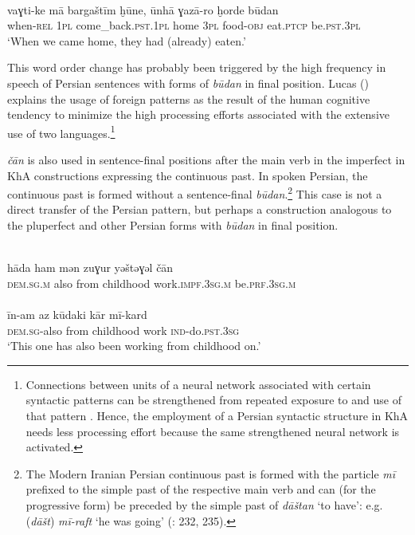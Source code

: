 \documentclass[output=paper,nonflat]{langsci/langscibook}
\begin{document}
\\
\gll vaɣti-ke mā bargaštīm ḫūne, ūnhā ɣazā-ro ḫorde būdan  \\
     when-\textsc{rel} \textsc{1pl} come\_back.\textsc{pst}.\textsc{1pl} home 3\textsc{pl} food-\textsc{obj} eat.\textsc{ptcp} be.\textsc{pst}.\textsc{3pl}\\
\glt ‘When we came home, they had (already) eaten.’
\z
\z

This word order change has probably been triggered by the high frequency in speech of Persian sentences with forms of \textit{būdan} in final position. Lucas (\citeyear[295]{Lucas2012}) explains the usage of foreign patterns as the result of the human cognitive tendency to minimize the high processing efforts associated with the extensive use of two languages.\footnote{{Connections between units of a neural network associated with certain syntactic patterns can be strengthened from repeated exposure to and use of that pattern} {\citep[291]{Lucas2012}. Hence, the employment of a Persian syntactic structure in KhA needs less processing effort because the same strengthened neural network is activated.}}

\textit{čān} is also used in sentence-final positions after the main verb in the imperfect in KhA constructions expressing the continuous past. In spoken Persian, the continuous past is formed without a sentence-final \textit{būdan}.\footnote{The Modern Iranian Persian continuous past is formed with the particle \textit{mī} prefixed to the simple past of the respective main verb and can (for the progressive form) be preceded by the simple past of \textit{dāštan} ‘to have’: e.g. (\textit{dāšt}) \textit{mī-raft} ‘he was going’ (\citealt{Majidi1990}: 232, 235).} This case is not a direct transfer of the Persian pattern, but perhaps a construction analogous to the pluperfect and other Persian forms with \textit{būdan} in final position. 

\ea
{}\\
\gll hāda ham mən zuɣur yəštəɣəl čān  \\
     \textsc{dem}.\textsc{sg}.\textsc{m} also from childhood work.\textsc{impf.3sg.m} be.\textsc{prf.3sg.m}\\
 
\\
\gll īn-am az kūdaki kār mī-kard \\
     \textsc{dem.sg}-also from childhood work \textsc{ind}{}-do.\textsc{pst.3sg}\\
\glt ‘This one has also been working from childhood on.’
\z\z
\end{document}
